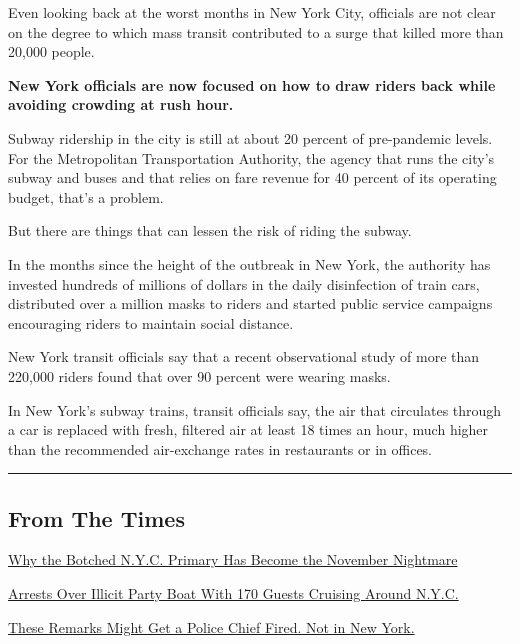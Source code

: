 Even looking back at the worst months in New York City, officials are
not clear on the degree to which mass transit contributed to a surge
that killed more than 20,000 people.

\textbf{New York officials are now focused on how to draw riders back
while avoiding crowding at rush hour.}

Subway ridership in the city is still at about 20 percent of
pre-pandemic levels. For the Metropolitan Transportation Authority, the
agency that runs the city's subway and buses and that relies on fare
revenue for 40 percent of its operating budget, that's a problem.

But there are things that can lessen the risk of riding the subway.

In the months since the height of the outbreak in New York, the
authority has invested hundreds of millions of dollars in the daily
disinfection of train cars, distributed over a million masks to riders
and started public service campaigns encouraging riders to maintain
social distance.

New York transit officials say that a recent observational study of more
than 220,000 riders found that over 90 percent were wearing masks.

In New York's subway trains, transit officials say, the air that
circulates through a car is replaced with fresh, filtered air at least
18 times an hour, much higher than the recommended air-exchange rates in
restaurants or in offices.

\begin{center}\rule{0.5\linewidth}{\linethickness}\end{center}

\hypertarget{from-the-times}{%
\subsection{From The Times}\label{from-the-times}}

\href{https://www.nytimes3xbfgragh.onion/2020/08/03/nyregion/nyc-mail-ballots-voting.html}{Why
the Botched N.Y.C. Primary Has Become the November Nightmare}

\href{https://www.nytimes3xbfgragh.onion/2020/08/02/nyregion/liberty-belle-illegal-party.html}{Arrests
Over Illicit Party Boat With 170 Guests Cruising Around N.Y.C.}

\href{https://www.nytimes3xbfgragh.onion/2020/08/03/nyregion/police-shea-de-blasio-nyc.html}{These
Remarks Might Get a Police Chief Fired. Not in New York.}

